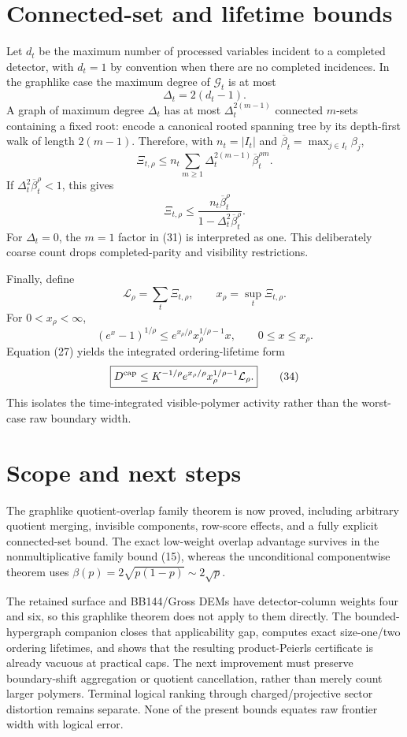 \documentclass[11pt]{article}
\newcommand{\1}{\mathbf 1}
\begin{document}
\section{Connected-set and lifetime bounds}

Let \(d_t\) be the maximum number of processed variables incident to a
completed detector, with \(d_t=1\) by convention when there are no completed
incidences.  In the graphlike case the maximum degree of \(\mathcal G_t\) is
at most
\[
 \Delta_t=2(d_t-1).
\tag{30}
\]
A graph of maximum degree \(\Delta_t\) has at most
\(\Delta_t^{2(m-1)}\) connected \(m\)-sets containing a fixed root: encode a
canonical rooted spanning tree by its depth-first walk of length
\(2(m-1)\).  Therefore, with \(n_t=|I_t|\) and
\(\overline\beta_t=\max_{j\in I_t}\beta_j\),
\[
 \Xi_{t,\rho}
 \le
 n_t\sum_{m\ge1}
 \Delta_t^{2(m-1)}\overline\beta_t^{\rho m}.
\tag{31}
\]
If \(\Delta_t^2\overline\beta_t^\rho<1\), this gives
\[
\boxed{
 \Xi_{t,\rho}
 \le
 \frac{n_t\overline\beta_t^\rho}
 {1-\Delta_t^2\overline\beta_t^\rho}.}
\tag{32}
\]
For \(\Delta_t=0\), the \(m=1\) factor in (31) is interpreted as one.
This deliberately coarse count drops completed-parity and visibility
restrictions.

Finally, define
\[
 \mathcal L_\rho=\sum_t\Xi_{t,\rho},
 \qquad
 x_\rho=\sup_t\Xi_{t,\rho}.
\tag{33}
\]
For \(0<x_\rho<\infty\),
\[
 (e^x-1)^{1/\rho}
 \le
 e^{x_\rho/\rho}x_\rho^{1/\rho-1}x,
 \qquad 0\le x\le x_\rho.
\]
Equation (27) yields the integrated ordering-lifetime form
\[
\boxed{
 D^{\rm cap}
 \le
 K^{-1/\rho}
 e^{x_\rho/\rho}
 x_\rho^{1/\rho-1}
 \mathcal L_\rho.}
\tag{34}
\]
This isolates the time-integrated visible-polymer activity rather than the
worst-case raw boundary width.

\section{Scope and next steps}

The graphlike quotient-overlap family theorem is now proved, including
arbitrary quotient merging, invisible components, row-score effects, and a
fully explicit connected-set bound.  The exact low-weight overlap advantage
survives in the nonmultiplicative family bound (15), whereas the unconditional
componentwise theorem uses
\(\beta(p)=2\sqrt{p(1-p)}\sim2\sqrt p\).

The retained surface and BB144/Gross DEMs have detector-column weights four
and six, so this graphlike theorem does not apply to them directly.  The
bounded-hypergraph companion closes that applicability gap, computes exact
size-one/two ordering lifetimes, and shows that the resulting product-Peierls
certificate is already vacuous at practical caps.  The next improvement must
preserve boundary-shift aggregation or quotient cancellation, rather than
merely count larger polymers.  Terminal logical ranking through
charged/projective sector distortion remains separate.  None of the present
bounds equates raw frontier width with logical error.
\end{document}
